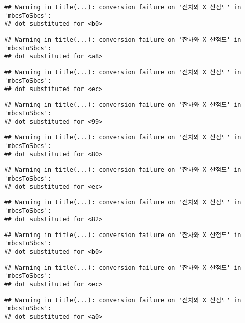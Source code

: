 \documentclass[
]{article}
\begin{document}
\begin{verbatim}
## Warning in title(...): conversion failure on '잔차와 X 산점도' in 'mbcsToSbcs':
## dot substituted for <b0>
\end{verbatim}

\begin{verbatim}
## Warning in title(...): conversion failure on '잔차와 X 산점도' in 'mbcsToSbcs':
## dot substituted for <a8>
\end{verbatim}

\begin{verbatim}
## Warning in title(...): conversion failure on '잔차와 X 산점도' in 'mbcsToSbcs':
## dot substituted for <ec>
\end{verbatim}

\begin{verbatim}
## Warning in title(...): conversion failure on '잔차와 X 산점도' in 'mbcsToSbcs':
## dot substituted for <99>
\end{verbatim}

\begin{verbatim}
## Warning in title(...): conversion failure on '잔차와 X 산점도' in 'mbcsToSbcs':
## dot substituted for <80>
\end{verbatim}

\begin{verbatim}
## Warning in title(...): conversion failure on '잔차와 X 산점도' in 'mbcsToSbcs':
## dot substituted for <ec>
\end{verbatim}

\begin{verbatim}
## Warning in title(...): conversion failure on '잔차와 X 산점도' in 'mbcsToSbcs':
## dot substituted for <82>
\end{verbatim}

\begin{verbatim}
## Warning in title(...): conversion failure on '잔차와 X 산점도' in 'mbcsToSbcs':
## dot substituted for <b0>
\end{verbatim}

\begin{verbatim}
## Warning in title(...): conversion failure on '잔차와 X 산점도' in 'mbcsToSbcs':
## dot substituted for <ec>
\end{verbatim}

\begin{verbatim}
## Warning in title(...): conversion failure on '잔차와 X 산점도' in 'mbcsToSbcs':
## dot substituted for <a0>
\end{verbatim}
\end{document}
